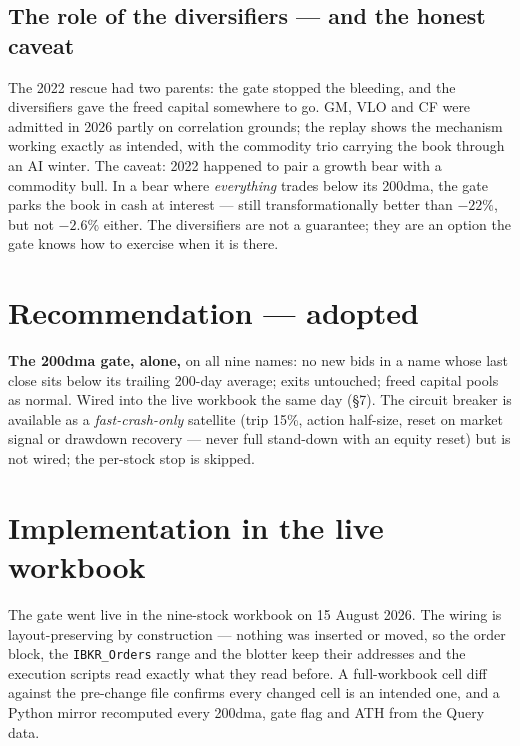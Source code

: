 \documentclass[11pt,a4paper]{article}
\begin{document}
\subsection{The role of the diversifiers --- and the honest caveat}

The 2022 rescue had two parents: the gate stopped the bleeding, and the
diversifiers gave the freed capital somewhere to go. GM, VLO and CF were admitted
in 2026 partly on correlation grounds; the replay shows the mechanism working
exactly as intended, with the commodity trio carrying the book through an AI
winter. The caveat: 2022 happened to pair a growth bear with a commodity bull. In
a bear where \emph{everything} trades below its 200dma, the gate parks the book
in cash at interest --- still transformationally better than $-22\%$, but not
$-2.6\%$ either. The diversifiers are not a guarantee; they are an option the
gate knows how to exercise when it is there.

\section{Recommendation --- adopted}

\begin{tcolorbox}[colback=bcgold!8, colframe=bcgold, boxrule=0.8pt,
  title={\bfseries Adopted 15 August 2026}, coltitle=bcnavy]
\textbf{The 200dma gate, alone,} on all nine names: no new bids in a name whose
last close sits below its trailing 200-day average; exits untouched; freed
capital pools as normal. Wired into the live workbook the same day (\S7).
The circuit breaker is available as a \emph{fast-crash-only} satellite (trip
15\%, action half-size, reset on market signal or drawdown recovery --- never
full stand-down with an equity reset) but is not wired; the per-stock stop is
skipped.
\end{tcolorbox}

\section{Implementation in the live workbook}

The gate went live in the nine-stock workbook on 15 August 2026. The wiring is
layout-preserving by construction --- nothing was inserted or moved, so the order
block, the \texttt{IBKR\_Orders} range and the blotter keep their addresses and
the execution scripts read exactly what they read before. A full-workbook cell
diff against the pre-change file confirms every changed cell is an intended one,
and a Python mirror recomputed every 200dma, gate flag and ATH from the Query
data.
\end{document}
